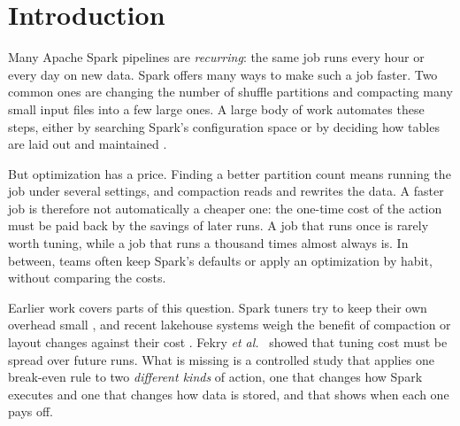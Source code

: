\section{Introduction}
\label{sec:intro}

Many Apache Spark pipelines are \emph{recurring}: the same job runs every hour or every day on
new data. Spark offers many ways to make such a job faster. Two common ones are changing the
number of shuffle partitions and compacting many small input files into a few large ones. A
large body of work automates these steps, either by searching Spark's configuration space
\cite{nguyen2018tuning,xin2022locat,lyu2024optimizer,herodotou2020survey} or by deciding how
tables are laid out and maintained \cite{gruenheid2025autocomp,meduri2026pto}.

But optimization has a price. Finding a better partition count means running the job under
several settings, and compaction reads and rewrites the data. A faster job is therefore not
automatically a cheaper one: the one-time cost of the action must be paid back by the savings
of later runs. A job that runs once is rarely worth tuning, while a job that runs a thousand
times almost always is. In between, teams often keep Spark's defaults or apply an
optimization by habit, without comparing the costs.

Earlier work covers parts of this question. Spark tuners try to keep their own overhead small
\cite{xin2022locat,li2025loftune}, and recent lakehouse systems weigh the benefit of
compaction or layout changes against their cost \cite{gruenheid2025autocomp,meduri2026pto}.
Fekry \emph{et al.}~\cite{fekry2020tune} showed that tuning cost must be spread over future
runs. What is missing is a controlled study that applies one break-even rule to two
\emph{different kinds} of action, one that changes how Spark executes and one that changes how
data is stored, and that shows when each one pays off.

